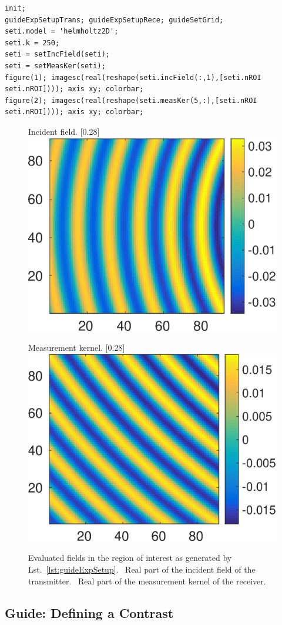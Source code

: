 \documentclass[a4paper]{article}
\begin{document}
\begin{lstlisting}[caption={Incident field (\textsf{setIncField}) and measurement kernel (\textsf{setMeasKer}) (\emph{source code}: \textsf{guides/guideExpSetup.m}).},label=lst:guideExpSetup]
init;
guideExpSetupTrans; guideExpSetupRece; guideSetGrid;
seti.model = 'helmholtz2D'; 
seti.k = 250;
seti = setIncField(seti); 
seti = setMeasKer(seti);
figure(1); imagesc(real(reshape(seti.incField(:,1),[seti.nROI seti.nROI]))); axis xy; colorbar;
figure(2); imagesc(real(reshape(seti.measKer(5,:),[seti.nROI seti.nROI]))); axis xy; colorbar;
\end{lstlisting}

\begin{figure}
\centering
\begin{subcaptionbox}{Incident field.
   \label{fig:guide:expSetup1}}[0.28\textwidth]{
   \includegraphics[height=0.24\textwidth]{figs/fig_guideExpSetup1}
  }
\end{subcaptionbox}\hspace{2em}
\begin{subcaptionbox}{Measurement kernel.
   \label{fig:guide:expSetup2}}[0.28\textwidth]{
   \includegraphics[height=0.24\textwidth]{figs/fig_guideExpSetup2}
  }
\end{subcaptionbox}
\caption{Evaluated fields in the region of interest as generated by Lst.~\ref{lst:guideExpSetup}.
~Real part of the incident field of the  transmitter. 
~Real part of the measurement kernel of the  receiver. 
}
\label{fig:guide:expSetup}
\end{figure}


\subsection{Guide: Defining a Contrast}\label{sec:guide:contrast}
\end{document}
